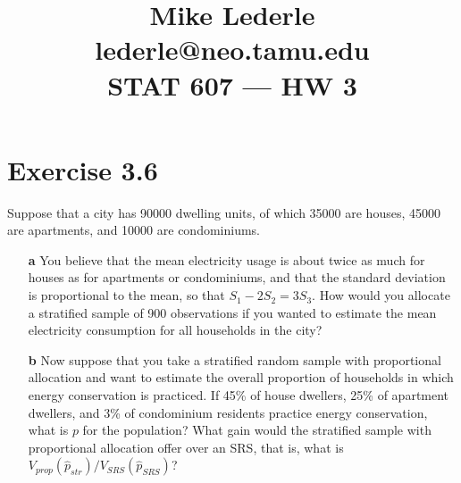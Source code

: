 \documentclass{article}\usepackage{graphicx, color}
\title{Mike Lederle\\lederle@neo.tamu.edu\\STAT 607 --- HW 3}
\begin{document}
\maketitle
\section*{Exercise 3.6}
Suppose that a city has 90000 dwelling units, of which 35000 are houses, 45000 are apartments, and 10000 are condominiums.
\begin{enumerate}
  \item[{\bf a}] You believe that the mean electricity usage is about twice as much for houses as for apartments or condominiums, and that the standard deviation is proportional to the mean, so that $S_1 - 2S_2 = 3S_3.$ How would you allocate a stratified sample of 900 observations if you wanted to estimate the mean electricity consumption for all households in the city?
  \item[{\bf b}] Now suppose that you take a stratified random sample with proportional allocation and want to estimate the overall proportion of households in which energy conservation is practiced. If 45\% of house dwellers, 25\% of apartment dwellers, and 3\% of condominium residents practice energy conservation, what is $p$ for the population? What gain would the stratified sample with proportional allocation offer over an SRS, that is, what is $V_{prop}(\hat{p}_{str}) / V_{SRS}(\hat{p}_{SRS})$?
\end{enumerate}
\end{document}
